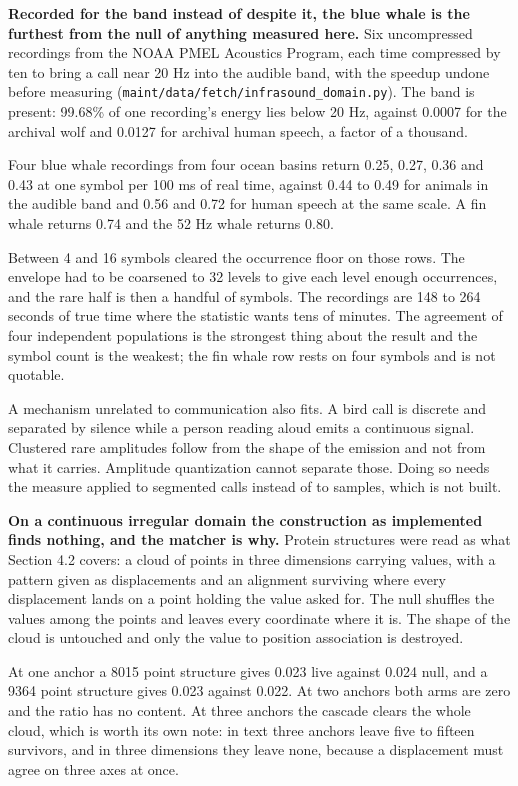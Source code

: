 \textbf{Recorded for the band instead of despite it, the blue whale is the furthest from the null of anything measured here.} Six uncompressed recordings from the NOAA PMEL Acoustics Program, each time compressed by ten to bring a call near 20 Hz into the audible band, with the speedup undone before measuring (\texttt{maint/\allowbreak{}data/\allowbreak{}fetch/\allowbreak{}infrasound\_\allowbreak{}domain.\allowbreak{}py}). The band is present: 99.68\% of one recording's energy lies below 20 Hz, against 0.0007 for the archival wolf and 0.0127 for archival human speech, a factor of a thousand.

Four blue whale recordings from four ocean basins return 0.25, 0.27, 0.36 and 0.43 at one symbol per 100 ms of real time, against 0.44 to 0.49 for animals in the audible band and 0.56 and 0.72 for human speech at the same scale. A fin whale returns 0.74 and the 52 Hz whale returns 0.80.

Between 4 and 16 symbols cleared the occurrence floor on those rows. The envelope had to be coarsened to 32 levels to give each level enough occurrences, and the rare half is then a handful of symbols. The recordings are 148 to 264 seconds of true time where the statistic wants tens of minutes. The agreement of four independent populations is the strongest thing about the result and the symbol count is the weakest; the fin whale row rests on four symbols and is not quotable.

A mechanism unrelated to communication also fits. A bird call is discrete and separated by silence while a person reading aloud emits a continuous signal. Clustered rare amplitudes follow from the shape of the emission and not from what it carries. Amplitude quantization cannot separate those. Doing so needs the measure applied to segmented calls instead of to samples, which is not built.

\textbf{On a continuous irregular domain the construction as implemented finds nothing, and the matcher is why.} Protein structures were read as what Section 4.2 covers: a cloud of points in three dimensions carrying values, with a pattern given as displacements and an alignment surviving where every displacement lands on a point holding the value asked for. The null shuffles the values among the points and leaves every coordinate where it is. The shape of the cloud is untouched and only the value to position association is destroyed.

At one anchor a 8015 point structure gives 0.023 live against 0.024 null, and a 9364 point structure gives 0.023 against 0.022. At two anchors both arms are zero and the ratio has no content. At three anchors the cascade clears the whole cloud, which is worth its own note: in text three anchors leave five to fifteen survivors, and in three dimensions they leave none, because a displacement must agree on three axes at once.

